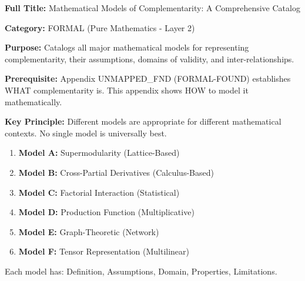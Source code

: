 \begin{tcolorbox}[colback=blue!5!white,colframe=blue!75!black,title=\textbf{Appendix UNMAPPED_MDL: FORMAL-MODELS}]
\textbf{Full Title:} Mathematical Models of Complementarity: A Comprehensive Catalog

\textbf{Category:} FORMAL (Pure Mathematics - Layer 2)

\textbf{Purpose:} Catalogs all major mathematical models for representing complementarity, their assumptions, domains of validity, and inter-relationships.

\textbf{Prerequisite:} Appendix UNMAPPED_FND (FORMAL-FOUND) establishes WHAT complementarity is. This appendix shows HOW to model it mathematically.

\textbf{Key Principle:} Different models are appropriate for different mathematical contexts. No single model is universally best.
\end{tcolorbox}

\begin{tcolorbox}[colback=gray!5!white,colframe=gray!75!black,title=\textbf{The Six Canonical Models}]
\small
\begin{enumerate}[noitemsep]
    \item \textbf{Model A:} Supermodularity (Lattice-Based)
    \item \textbf{Model B:} Cross-Partial Derivatives (Calculus-Based)
    \item \textbf{Model C:} Factorial Interaction (Statistical)
    \item \textbf{Model D:} Production Function (Multiplicative)
    \item \textbf{Model E:} Graph-Theoretic (Network)
    \item \textbf{Model F:} Tensor Representation (Multilinear)
\end{enumerate}

Each model has: Definition, Assumptions, Domain, Properties, Limitations.
\end{tcolorbox}

